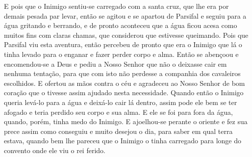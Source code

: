 E pois que o Inimigo sentiu-se carregado com a santa cruz, que lhe era por
demais pesada par levar, então se agitou e se apartou de Parsifal e seguiu
para a água gritando e berrando, e de pronto aconteceu que a água ficou acesa
como muitos fins com claras chamas, que considerou que estivesse queimando. 
Pois que Parsifal viu esta aventura, então percebeu de
pronto que era o Inimigo que lá o tinha levado para o enganar e fazer perder
corpo e alma. Então se abençoou e encomendou-se a Deus e pediu a Nosso Senhor
que não o deixasse cair em nenhuma tentação, para que com isto não perdesse a
companhia dos cavaleiros escolhidos. E ofertou as mãos contra o céu e agradeceu
ao Nosso Senhor de bom coração que o tivesse assim ajudado nesta necessidade.
Quando então o Inimigo queria levá-lo para a água e deixá-lo cair lá dentro,
assim pode ele bem se ter afogado e teria perdido seu corpo e sua alma. E ele
se foi para fora da água, quando, porém, tinha medo do Inimigo. E ajoelhou-se
perante o oriente e fez sua prece assim como conseguiu e muito desejou o dia,
para saber em qual terra estava, quando bem lhe pareceu que o Inimigo o tinha
carregado para longe do convento onde ele viu o rei ferido. 


